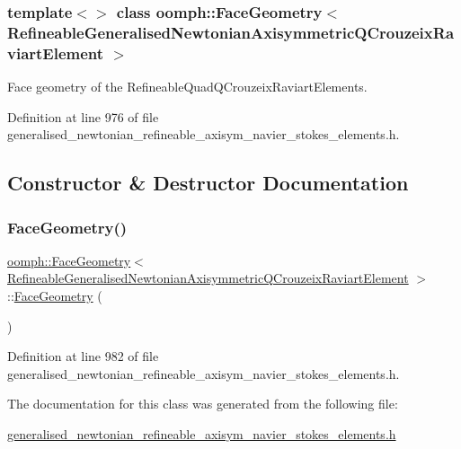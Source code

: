 \subsubsection*{template$<$$>$\newline
class oomph\+::\+Face\+Geometry$<$ Refineable\+Generalised\+Newtonian\+Axisymmetric\+Q\+Crouzeix\+Raviart\+Element $>$}

Face geometry of the Refineable\+Quad\+Q\+Crouzeix\+Raviart\+Elements. 

Definition at line 976 of file generalised\+\_\+newtonian\+\_\+refineable\+\_\+axisym\+\_\+navier\+\_\+stokes\+\_\+elements.\+h.



\subsection{Constructor \& Destructor Documentation}
\mbox{\label{classoomph_1_1FaceGeometry_3_01RefineableGeneralisedNewtonianAxisymmetricQCrouzeixRaviartElement_01_4_a2b71d7055924c74769594f0a0d17b407}} 
\subsubsection{\texorpdfstring{Face\+Geometry()}{FaceGeometry()}}
{\footnotesize\ttfamily \hyperlink{classoomph_1_1FaceGeometry}{oomph\+::\+Face\+Geometry}$<$ \hyperlink{classoomph_1_1RefineableGeneralisedNewtonianAxisymmetricQCrouzeixRaviartElement}{Refineable\+Generalised\+Newtonian\+Axisymmetric\+Q\+Crouzeix\+Raviart\+Element} $>$\+::\hyperlink{classoomph_1_1FaceGeometry}{Face\+Geometry} (\begin{DoxyParamCaption}{ }\end{DoxyParamCaption})\hspace{0.3cm}{\ttfamily [inline]}}



Definition at line 982 of file generalised\+\_\+newtonian\+\_\+refineable\+\_\+axisym\+\_\+navier\+\_\+stokes\+\_\+elements.\+h.



The documentation for this class was generated from the following file\+:\begin{DoxyCompactItemize}
\item 
\hyperlink{generalised__newtonian__refineable__axisym__navier__stokes__elements_8h}{generalised\+\_\+newtonian\+\_\+refineable\+\_\+axisym\+\_\+navier\+\_\+stokes\+\_\+elements.\+h}\end{DoxyCompactItemize}
